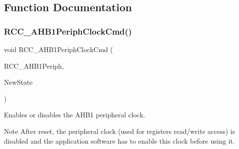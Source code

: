 \subsection{Function Documentation}
\mbox{\label{group___r_c_c___group3_ga80c89116820d48bb38db2e7d5e5a49b9}} 
\subsubsection{\texorpdfstring{R\+C\+C\+\_\+\+A\+H\+B1\+Periph\+Clock\+Cmd()}{RCC\_AHB1PeriphClockCmd()}}
{\footnotesize\ttfamily void R\+C\+C\+\_\+\+A\+H\+B1\+Periph\+Clock\+Cmd (\begin{DoxyParamCaption}\item[{uint32\+\_\+t}]{R\+C\+C\+\_\+\+A\+H\+B1\+Periph,  }\item[{Functional\+State}]{New\+State }\end{DoxyParamCaption})}



Enables or disables the A\+H\+B1 peripheral clock. 

\begin{DoxyNote}{Note}
After reset, the peripheral clock (used for registers read/write access) is disabled and the application software has to enable this clock before using it. 
\end{DoxyNote}

